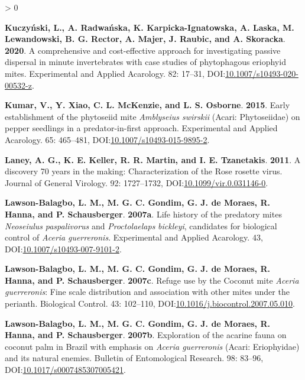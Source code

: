 \documentclass{ufdissertation}[overrideChapters] %
\newlength{\cslhangindent}
\newenvironment{CSLReferences}[2] %
 {%
  \setlength{\parindent}{0pt}
  \ifodd #1 \everypar{\setlength{\hangindent}{\cslhangindent}}\ignorespaces\fi
  \ifnum #2 > 0
  \setlength{\parskip}{#2\baselineskip}
  \fi
 }%
 {}
\begin{document}
{\begin{CSLReferences}{1}{1}
\leavevmode{}%
\textbf{Kuczyński, L., A. Radwańska, K. Karpicka-Ignatowska, A. Laska, M. Lewandowski, B. G. Rector, A. Majer, J. Raubic, and A. Skoracka}. \textbf{2020}. A comprehensive and cost-effective approach for investigating passive dispersal in minute invertebrates with case studies of phytophagous eriophyid mites. Experimental and Applied Acarology. 82: 17--31, DOI:\href{https://doi.org/10.1007/s10493-020-00532-z}{10.1007/s10493-020-00532-z}.

\leavevmode{}%
\textbf{Kumar, V., Y. Xiao, C. L. McKenzie, and L. S. Osborne}. \textbf{2015}. Early establishment of the phytoseiid mite {\emph{Amblyseius swirskii}} ({Acari}: {Phytoseiidae}) on pepper seedlings in a predator-in-first approach. Experimental and Applied Acarology. 65: 465--481, DOI:\href{https://doi.org/10.1007/s10493-015-9895-2}{10.1007/s10493-015-9895-2}.

\leavevmode{}%
\textbf{Laney, A. G., K. E. Keller, R. R. Martin, and I. E. Tzanetakis}. \textbf{2011}. A discovery 70 years in the making: Characterization of the {Rose rosette virus}. Journal of General Virology. 92: 1727--1732, DOI:\href{https://doi.org/10.1099/vir.0.031146-0}{10.1099/vir.0.031146-0}.

\leavevmode{}%
\textbf{Lawson-Balagbo, L. M., M. G. C. Gondim, G. J. de Moraes, R. Hanna, and P. Schausberger}. \textbf{2007a}. Life history of the predatory mites {\emph{Neoseiulus}} {\emph{paspalivorus}} and {\emph{Proctolaelaps}} {\emph{bickleyi}}, candidates for biological control of {\emph{Aceria}} {\emph{guerreronis}}. Experimental and Applied Acarology. 43, DOI:\href{https://doi.org/10.1007/s10493-007-9101-2}{10.1007/s10493-007-9101-2}.

\leavevmode{}%
\textbf{Lawson-Balagbo, L. M., M. G. C. Gondim, G. J. de Moraes, R. Hanna, and P. Schausberger}. \textbf{2007c}. Refuge use by the {Coconut mite} {\emph{Aceria guerreronis}}: Fine scale distribution and association with other mites under the perianth. Biological Control. 43: 102--110, DOI:\href{https://doi.org/10.1016/j.biocontrol.2007.05.010}{10.1016/j.biocontrol.2007.05.010}.

\leavevmode{}%
\textbf{Lawson-Balagbo, L. M., M. G. C. Gondim, G. J. de Moraes, R. Hanna, and P. Schausberger}. \textbf{2007b}. Exploration of the acarine fauna on coconut palm in {Brazil} with emphasis on {\emph{Aceria guerreronis}} ({Acari}: {Eriophyidae}) and its natural enemies. Bulletin of Entomological Research. 98: 83--96, DOI:\href{https://doi.org/10.1017/s0007485307005421}{10.1017/s0007485307005421}.


\end{CSLReferences}}
\end{document}
